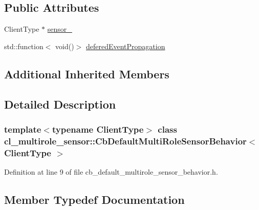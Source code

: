 \subsection*{Public Attributes}
\begin{DoxyCompactItemize}
\item 
Client\+Type $\ast$ \hyperlink{classcl__multirole__sensor_1_1CbDefaultMultiRoleSensorBehavior_a201893c3c859259eac3166405f3509cb}{sensor\+\_\+}
\item 
std\+::function$<$ void()$>$ \hyperlink{classcl__multirole__sensor_1_1CbDefaultMultiRoleSensorBehavior_a18f86fd2fd9c3575b62a2c58953b7d33}{defered\+Event\+Propagation}
\end{DoxyCompactItemize}
\subsection*{Additional Inherited Members}


\subsection{Detailed Description}
\subsubsection*{template$<$typename Client\+Type$>$\newline
class cl\+\_\+multirole\+\_\+sensor\+::\+Cb\+Default\+Multi\+Role\+Sensor\+Behavior$<$ Client\+Type $>$}



Definition at line 9 of file cb\+\_\+default\+\_\+multirole\+\_\+sensor\+\_\+behavior.\+h.



\subsection{Member Typedef Documentation}
\mbox{\label{classcl__multirole__sensor_1_1CbDefaultMultiRoleSensorBehavior_aa23bc8c99de1eddad01d094bdab62aa4}} 

